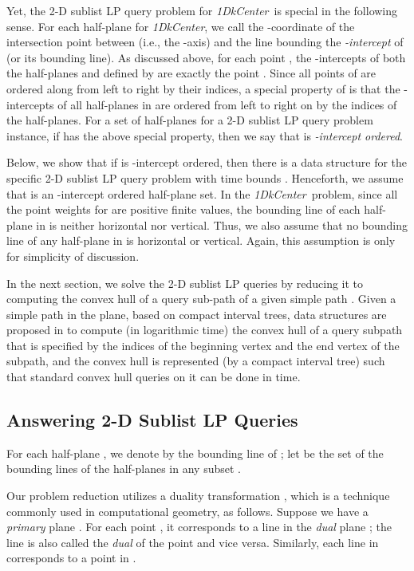 \documentclass{llncs}
\def\problem{{\it 1DkCenter}}
\begin{document}
Yet, the 2-D sublist LP query problem for
\problem\ is special in the
following sense. For each half-plane  for \problem, we call the
-coordinate of the intersection point between  (i.e., the -axis)
and the line bounding  the {\em -intercept} of 
(or its bounding line). As discussed above, for each
point , the -intercepts of both the half-planes 
and  defined by  are exactly the point . Since all
points of  are ordered along  from left to right by their
indices, a special property of  is that the -intercepts of
all half-planes in  are ordered from left to right on  by
the indices of the half-planes. For a set  of half-planes for a
2-D sublist LP query problem instance, if  has the above special property,
then we say that  is {\em -intercept ordered}.


Below, we show that if  is -intercept ordered, then there is a
data structure for the specific 2-D sublist LP query problem with time
bounds .
Henceforth, we assume that  is an -intercept ordered half-plane
set. In the \problem\ problem, since all the point weights for 
are positive finite values, the bounding line of each half-plane in
 is neither horizontal nor vertical. Thus, we also assume that
no bounding line of any half-plane in  is horizontal
or vertical. Again, this assumption is only for simplicity of discussion.


In the next section, we solve the 2-D sublist LP queries by reducing
it to computing the convex hull of a query sub-path of a given simple
path \cite{ref:GuibasCo91}.
Given a simple path in the plane, based on
compact interval trees, data structures are proposed in
\cite{ref:GuibasCo91} to compute (in logarithmic time)
the convex hull of a query subpath
that is specified by the indices of the beginning vertex and the end
vertex of the subpath, and the convex hull is represented
(by a compact interval tree) such that standard convex hull
queries on it can be done in  time.

\subsection{Answering 2-D Sublist LP Queries}


For each half-plane , we denote by  the
bounding line of ; let  be the set of the bounding lines of
the half-planes in any subset .


Our problem reduction utilizes a duality transformation
\cite{ref:deBergCo08}, which is a technique commonly used in
computational geometry, as follows. Suppose we have a
{\em primary} plane . For each point , it
corresponds to a line  in the {\em dual} plane ; the
line is also called the {\em dual} of the point and vice versa.
Similarly, each line  in  corresponds to a point
 in .
\end{document}
